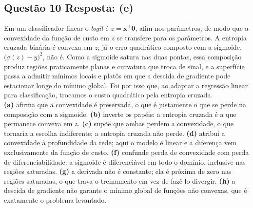 \documentclass[11pt,a4paper]{article}
\begin{document}
\subsection*{Questão 10 \textemdash{} Resposta: (e)}
Em um classificador linear o \textit{logit} é $z = \mathbf{x}^{\top}\boldsymbol{\theta}$, afim nos parâmetros, de modo que a convexidade da função de custo em $z$ se transfere para os parâmetros. A entropia cruzada binária é convexa em $z$; já o erro quadrático composto com a sigmoide, $\bigl(\sigma(z) - y\bigr)^2$, não é. Como a sigmoide satura nas duas pontas, essa composição produz regiões praticamente planas e curvatura que troca de sinal, e a superfície passa a admitir mínimos locais e platôs em que a descida de gradiente pode estacionar longe do mínimo global. Foi por isso que, ao adaptar a regressão linear para classificação, trocamos o custo quadrático pela entropia cruzada.\\
\textbf{(a)} afirma que a convexidade é preservada, o que é justamente o que se perde na composição com a sigmoide.
\textbf{(b)} inverte os papéis: a entropia cruzada é a que permanece convexa em $z$.
\textbf{(c)} supõe que ambas perdem a convexidade, o que tornaria a escolha indiferente; a entropia cruzada não perde.
\textbf{(d)} atribui a convexidade à profundidade da rede; aqui o modelo é linear e a diferença vem exclusivamente da função de custo.
\textbf{(f)} confunde perda de convexidade com perda de diferenciabilidade: a sigmoide é diferenciável em todo o domínio, inclusive nas regiões saturadas.
\textbf{(g)} a derivada não é constante; ela é próxima de zero nas regiões saturadas, o que trava o treinamento em vez de fazê-lo divergir.
\textbf{(h)} a descida de gradiente não garante o mínimo global de funções não convexas, que é exatamente o problema levantado.
\end{document}
